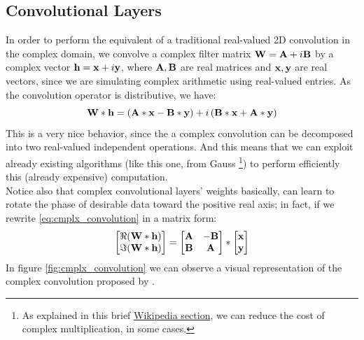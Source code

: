 \documentclass[../main.tex]{subfiles}
\begin{document}
\subsection*{Convolutional Layers}
In order to perform the equivalent of a traditional real-valued 2D convolution in the complex domain, we convolve a complex filter matrix $\vb{W} = \vb{A}+i\vb{B}$ by a complex vector $\vb{h} = \vb{x}+i\vb{y}$, where $\vb{A}, \vb{B}$ are real matrices and $\vb{x}, \vb{y}$ are real vectors, since we are simulating complex arithmetic using real-valued entries. As the convolution operator is distributive, we have:
\begin{equation}
	\vb{W} * \vb{h} = \left(\vb{A}*\vb{x}-\vb{B}*\vb{y}\right) + i\left(\vb{B}*\vb{x}+\vb{A}*\vb{y}\right)
	\label{eq:cmplx_convolution}
\end{equation}
This is a very nice behavior, since the a complex convolution can be decomposed into two real-valued independent operations. And this means that we can exploit already existing algorithms (like this one, from Gauss \footnote{As explained in this brief \href{https://en.wikipedia.org/wiki/Multiplication\_algorithm\#Complex\_multiplication\_algorithm}{Wikipedia section}, we can reduce the cost of complex multiplication, in some cases.}) to perform efficiently this (already expensive) computation.\\
Notice also that complex convolutional layers' weights basically, can learn to rotate the phase of desirable data toward the positive real axis; in fact, if we rewrite \ref{eq:cmplx_convolution} in a matrix form:
\[ \mqty[\real(\vb{W}*\vb{h}) \\ \imaginary(\vb{W}*\vb{h})] = \mqty[\vb{A} & -\vb{B}\\ \vb{B} & \vb{A}] * \mqty[\vb{x} \\ \vb{y}]	 \]
In figure \ref{fig:cmplx_convolution} we can observe a visual representation of the complex convolution proposed by \cite{trabelsi2018deep}.
\end{document}
